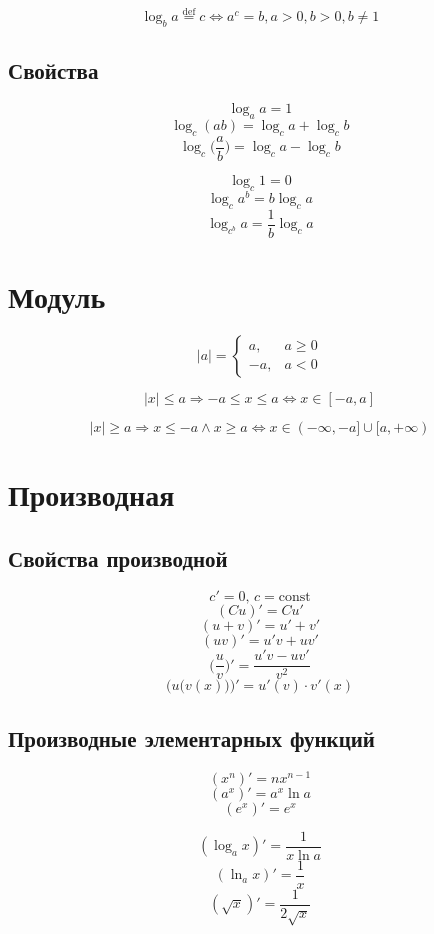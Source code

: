 \documentclass[
  letterpaper,
  DIV=11,
  numbers=noendperiod]{scrreprt}
\theoremstyle{definition}
\theoremstyle{remark}
\begin{document}
\[\log_b a \overset{\text{def}}{=}c \Leftrightarrow a^c = b, a > 0, b > 0, b \neq 1\]

\subsection{Свойства}\label{formulas_log_identities}

\[\log_a a = 1\] \[\log_c(ab) = \log_c a + \log_c b\]
\[\log_c\Big(\frac{a}{b}\Big) = \log_c a - \log_c b\]

\[\log_c 1 = 0\] \[\log_c a^b = b \log_c a\]
\[\log_{c^b} a = \frac{1}{b} \log_c a\]

\section{Модуль}\label{formulas_abs}

\[
|a| = 
\begin{cases}
a, &a \geq 0 \\
-a, &a < 0
\end{cases}
\]

\[|x| \leq a \Rightarrow -a \leq x \leq a \Leftrightarrow x \in [-a, a]\]

\[|x| \geq a \Rightarrow x \leq -a \wedge x \geq a \Leftrightarrow x \in (-\infty, -a] \cup [a, +\infty)\]

\section{Производная}\label{formulas_deriv}

\subsection{Свойства производной}\label{formulas_deriv_props}

\[c' = 0, \, c = \text{const}\] \[(Cu)' = Cu'\] \[(u + v)' = u' + v'\]
\[(uv)' = u'v + uv'\]
\[\Big( \frac{u}{v} \Big)' = \frac{u'v - uv'}{v^2}\]
\[\Big(u\big(v(x)\big)\Big)' = u'(v) \cdot v'(x)\]

\subsection{Производные элементарных
функций}\label{formulas_deriv_funcs}

\[(x^n)' = nx^{n-1}\] \[(a^x)' = a^x \ln a\] \[(e^x)' = e^x\]

\[(\log_a x)' = \frac{1}{x \ln a}\] \[(\ln_a x)' = \frac{1}{x}\]
\[(\sqrt{x})' = \frac{1}{2\sqrt{x}}\]
\end{document}
